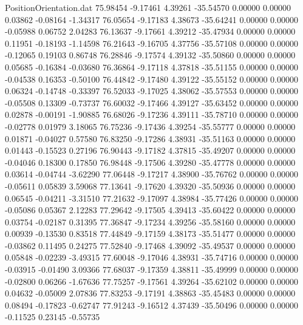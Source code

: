 \begin{filecontents}{PositionOrientation.dat}
  75.98454   -9.17461    4.39261   -35.54570    0.00000    0.00000    0.03862   -0.08164   -1.34317
  76.05654   -9.17183    4.38673   -35.64241    0.00000    0.00000   -0.05988    0.06752    2.04283
  76.13637   -9.17661    4.39212   -35.47934    0.00000    0.00000    0.11951   -0.18193   -1.14598
  76.21643   -9.16705    4.37756   -35.57108    0.00000    0.00000   -0.12065    0.19103    0.86748
  76.28846   -9.17574    4.39132   -35.50860    0.00000    0.00000    0.05685   -0.16384   -0.03680
  76.36864   -9.17118    4.37818   -35.51155    0.00000    0.00000   -0.04538    0.16353   -0.50100
  76.44842   -9.17480    4.39122   -35.55152    0.00000    0.00000    0.06324   -0.14748   -0.33397
  76.52033   -9.17025    4.38062   -35.57553    0.00000    0.00000   -0.05508    0.13309   -0.73737
  76.60032   -9.17466    4.39127   -35.63452    0.00000    0.00000    0.02878   -0.00191   -1.90885
  76.68026   -9.17236    4.39111   -35.78710    0.00000    0.00000   -0.02778    0.01979    3.18065
  76.75236   -9.17436    4.39254   -35.55777    0.00000    0.00000    0.01871   -0.04027    0.57580
  76.83250   -9.17286    4.38931   -35.51163    0.00000    0.00000    0.01443   -0.15523    0.27196
  76.90443   -9.17182    4.37815   -35.49207    0.00000    0.00000   -0.04046    0.18300    0.17850
  76.98448   -9.17506    4.39280   -35.47778    0.00000    0.00000    0.03614   -0.04744   -3.62290
  77.06448   -9.17217    4.38900   -35.76762    0.00000    0.00000   -0.05611    0.05839    3.59068
  77.13641   -9.17620    4.39320   -35.50936    0.00000    0.00000    0.06545   -0.04211   -3.31510
  77.21632   -9.17097    4.38984   -35.77426    0.00000    0.00000   -0.05086    0.05367    2.12283
  77.29642   -9.17505    4.39413   -35.60422    0.00000    0.00000    0.03754   -0.02187    0.31395
  77.36847   -9.17234    4.39256   -35.58160    0.00000    0.00000    0.00939   -0.13530    0.83518
  77.44849   -9.17159    4.38173   -35.51477    0.00000    0.00000   -0.03862    0.11495    0.24275
  77.52840   -9.17468    4.39092   -35.49537    0.00000    0.00000    0.05848   -0.02239   -3.49315
  77.60048   -9.17046    4.38931   -35.74716    0.00000    0.00000   -0.03915   -0.01490    3.09366
  77.68037   -9.17359    4.38811   -35.49999    0.00000    0.00000   -0.02800    0.06266   -1.67636
  77.75257   -9.17561    4.39264   -35.62102    0.00000    0.00000    0.04632   -0.05009    2.07836
  77.83253   -9.17191    4.38863   -35.45483    0.00000    0.00000    0.08494   -0.17823   -0.62747
  77.91243   -9.16512    4.37439   -35.50496    0.00000    0.00000   -0.11525    0.23145   -0.55735

\end{filecontents}
